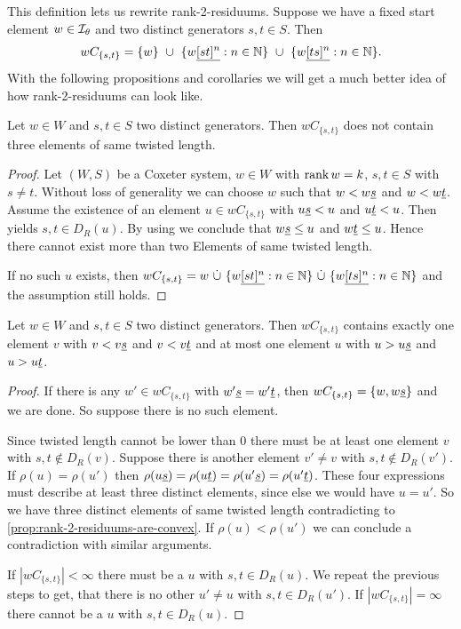 This definition lets us rewrite rank-2-residuums. Suppose we have a fixed start element $w \in \mathcal{I}_{\theta}$ and two distinct generators $s,t \in S$. Then
$$ wC_{\{s,t\}} = \{ w \} \ \cup \ \{ w \underline{[st]^n} : n \in \mathbb{N} \} \ \cup \ \{ w \underline{[ts]^n} : n \in \mathbb{N} \}. $$
With the following propositions and corollaries we will get a much better idea of how rank-2-residuums can look like.

\begin{prop}
	Let $w \in W$ and $s,t \in S$ two distinct generators. Then $wC_{\{s,t\}}$ does not contain three elements of same twisted length.

	\begin{proof}
		Let $(W,S)$ be a Coxeter system, $w \in W$ with $\operatorname{rank} w = k$, $s, t \in S$ with $s \neq t$. Without loss of generality we can choose $w$ such that $w < w \underline{s}$ and $w < w \underline{t}$. Assume the existence of an element $u \in wC_{\{s,t\}}$ with $u \underline{s} < u$ and $u \underline{t} < u$. Then \cite[Lemma 3.8]{hultman:comb-twisted-invo} yields $s,t \in D_R(u)$. By using \cite[Lemma 3.9]{hultman:comb-twisted-invo} we conclude that $w \underline{s} \leq u$ and $w \underline{t} \leq u$. Hence there cannot exist more than two Elements of same twisted length.

		If no such $u$ exists, then $wC_{\{s,t\}} = w \ \dot \cup \ \{ w \ul{[st]^n} : n \in \nn \} \ \dot \cup \ \{ w \ul{[ts]^n} : n \in \nn \}$ and the assumption still holds.
	\end{proof}
\end{prop}

\begin{coro}
	Let $w \in W$ and $s,t \in S$ two distinct generators. Then $wC_{\{s,t\}}$ contains exactly one element $v$ with $v < v \underline{s}$ and $v < v \underline{t}$ and at most one element $u$ with $u > u \underline{s}$ and $u > u \underline{t}$.

	\begin{proof}
		If there is any $w' \in wC_{\{s,t\}}$ with $w' \underline{s} = w' \underline{t}$, then $wC_{\{s,t\}} = \{ w, w \underline{s} \}$ and we are done. So suppose there is no such element.

		Since twisted length cannot be lower than 0 there must be at least one element $v$ with $s,t \notin D_R(v)$. Suppose there is another element $v' \neq v$ with $s,t \notin D_R(v')$. If $\rho(u) = \rho(u')$ then $\rho(u \underline{s}) = \rho(u \underline{t}) = \rho(u' \underline{s}) = \rho(u' \underline{t})$. These four expressions must describe at least three distinct elements, since else we would have $u = u'$. So we have three distinct elements of same twisted length contradicting to \ref{prop:rank-2-residuums-are-convex}. If $\rho(u) < \rho(u')$ we can conclude a contradiction with similar arguments.

		If $|wC_{\{s,t\}}| < \infty$ there must be a $u$ with $s,t \in D_R(u)$. We repeat the previous steps to get, that there is no other $u' \neq u$ with $s,t \in D_R(u')$. If $|wC_{\{s,t\}}| = \infty$ there cannot be a $u$ with $s,t \in D_R(u)$.
	\end{proof}
\end{coro}

